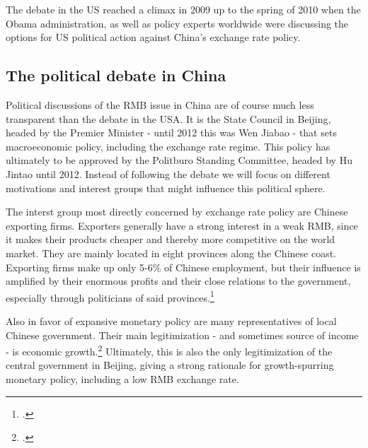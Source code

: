 
The debate in the US reached a climax in 2009 up to the spring of 2010 when the Obama administration, as well as policy experts worldwide were discussing the options for US political action against China's exchange rate policy.

\subsection{The political debate in China}


Political discussions of the RMB issue in China are of course much less 
transparent than the debate in the USA. It is the State Council in 
Beijing, headed by the Premier Minister - until 2012 this was Wen Jiabao 
- that sets macroeconomic policy, including the exchange rate regime.  
This policy has ultimately to be approved by the Politburo Standing 
Committee, headed by Hu Jintao until 2012. Instead of following the 
debate we will focus on different motivations and interest groups that 
might influence this political sphere.

The interst group most directly concerned by exchange rate policy are 
Chinese exporting firms. Exporters generally have a strong interest in a 
weak RMB, since it makes their products cheaper and thereby more 
competitive on the world market. They are mainly located in eight 
provinces along the Chinese coast. Exporting firms make up only 5-6\% of 
Chinese employment, but their influence is amplified by their enormous 
profits and their close relations to the government, especially through 
politicians of said provinces.\footnote{\cite[p. 202]{Breslin2010}.} 

Also in favor of expansive monetary policy are many representatives of 
local Chinese government. Their main legitimization - and sometimes 
source of income - is economic growth.\footnote{\cite[pp. 
19]{Levy2011}.} Ultimately, this is also the only legitimization of the 
central government in Beijing, giving a strong rationale for 
growth-spurring monetary policy, including a low RMB exchange rate.

